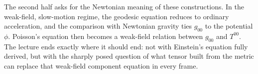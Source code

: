 The second half asks for the Newtonian meaning of these constructions. In the weak-field, slow-motion regime, the geodesic equation reduces to ordinary acceleration, and the comparison with Newtonian gravity ties \(g_{00}\) to the potential \(\phi\). Poisson's equation then becomes a weak-field relation between \(g_{00}\) and \(T^{00}\). The lecture ends exactly where it should end: not with Einstein's equation fully derived, but with the sharply posed question of what tensor built from the metric can replace that weak-field component equation in every frame.